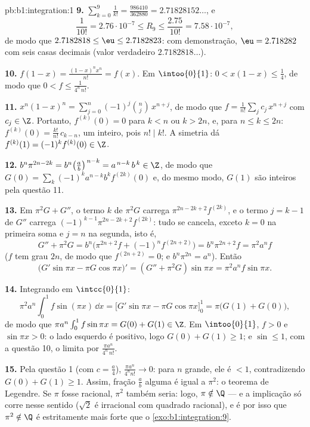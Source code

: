 \begin{solution}{pb:b1:integration:1}
\textbf{9.} $\sum_{k=0}^{9} \frac{1}{k!} = \frac{986410}{362880}
= 2.71828152\dots$, e
\[
\frac{1}{10!} = 2.76\cdot10^{-7} \leq R_9 \leq
\frac{2.75}{10!} = 7.58\cdot10^{-7} ,
\]
de modo que $2.7182818 \leq \eu \leq 2.7182823$: com demonstração, $\eu =
2.718282$ com seis casas decimais (valor verdadeiro $2.7182818\dots$).

\textbf{10.} $f(1 - x) = \frac{(1-x)^n x^n}{n!} = f(x)$. Em
$\intoo{0}{1}$: $0 < x(1-x) \leq \frac14$, de modo que $0 < f \leq
\frac{1}{4^n\,n!}$.

\textbf{11.} $x^n(1-x)^n = \sum_{j=0}^{n} (-1)^j\binom
nj\,x^{n+j}$, de modo que $f = \frac{1}{n!}\sum_j c_j\,x^{n+j}$ com
$c_j \in \Z$. Portanto, $f^{(k)}(0) = 0$ para $k < n$ ou $k > 2n$,
e, para $n \leq k \leq 2n$: $f^{(k)}(0) = \frac{k!}{n!}\,
c_{k-n}$, um inteiro, pois $n! \mid k!$. A simetria dá
$f^{(k)}(1) = (-1)^k f^{(k)}(0) \in \Z$.

\textbf{12.} $b^n \pi^{2n-2k} = b^n\bigl(\frac
ab\bigr)^{\,n-k} = a^{\,n-k}\,b^{\,k} \in \Z$, de modo que $G(0) =
\sum_k (-1)^k a^{n-k} b^k f^{(2k)}(0)$ e, do mesmo modo, $G(1)$ são
inteiros pela questão 11.

\textbf{13.} Em $\pi^2 G + G''$, o termo $k$ de $\pi^2 G$
carrega $\pi^{2n-2k+2}f^{(2k)}$, e o termo $j = k - 1$ de
$G''$ carrega $(-1)^{k-1}\pi^{2n-2k+2}f^{(2k)}$: tudo se
cancela, exceto $k = 0$ na primeira soma e $j = n$ na
segunda, isto é,
\[
G'' + \pi^2 G = b^n\bigl(\pi^{2n+2} f + (-1)^n f^{(2n+2)}\bigr)
= b^n \pi^{2n+2} f = \pi^2 a^n f
\]
($f$ tem grau $2n$, de modo que $f^{(2n+2)} = 0$; e $b^n\pi^{2n} =
a^n$). Então
\[
\bigl(G'\sin\pi x - \pi G\cos\pi x\bigr)'
= (G'' + \pi^2 G)\sin \pi x = \pi^2 a^n f\sin\pi x .
\]

\textbf{14.} Integrando em $\intcc{0}{1}$:
\[
\pi^2 a^n \int_0^1 f\sin(\pi x)\,\dd x
= \bigl[G'\sin\pi x - \pi G\cos\pi x\bigr]_0^1
= \pi\bigl(G(1) + G(0)\bigr) ,
\]
de modo que $\pi a^n \int_0^1 f\sin\pi x = G(0) + G(1) \in \Z$. Em
$\intoo{0}{1}$, $f > 0$ e $\sin\pi x > 0$: o lado esquerdo é
positivo, logo $G(0) + G(1) \geq 1$; e $\sin \leq 1$, com a
questão 10, o limita por $\frac{\pi a^n}{4^n\,n!}$.

\textbf{15.} Pela questão 1 (com $c = \frac a4$),
$\frac{\pi a^n}{4^n n!} \to 0$: para $n$ grande, ele é $< 1$,
contradizendo $G(0) + G(1) \geq 1$. Assim, fração $\frac ab$ alguma
é igual a $\pi^2$: o teorema de Legendre. Se $\pi$ fosse racional,
$\pi^2$ também seria: logo, $\pi \notin \Q$ --- e a implicação
só corre nesse sentido ($\sqrt2$ é irracional com quadrado
racional), e é por isso que $\pi^2 \notin \Q$ é estritamente mais forte
que o \cref{exo:b1:integration:9}.


\end{solution}
